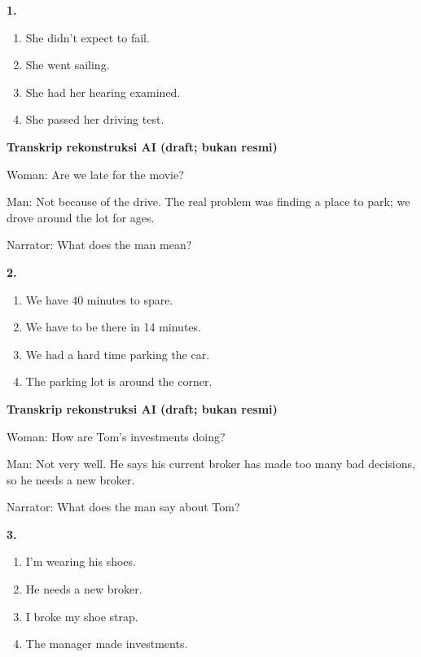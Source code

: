 \documentclass[12pt]{article}
\begin{document}
\noindent\textbf{1.}
\begin{enumerate}[label=(\Alph*),leftmargin=*,itemsep=0.2em]
\item She didn't expect to fail.
\item She went sailing.
\item She had her hearing examined.
\item She passed her driving test.
\end{enumerate}
\par
\vspace{0.25\baselineskip}
\begin{exampleblock}
\textbf{Transkrip rekonstruksi AI (draft; bukan resmi)}\par
Woman: Are we late for the movie?\par
Man: Not because of the drive. The real problem was finding a place to park; we drove around the lot for ages.\par
Narrator: What does the man mean?\par
\end{exampleblock}
\noindent\textbf{2.}
\begin{enumerate}[label=(\Alph*),leftmargin=*,itemsep=0.2em]
\item We have 40 minutes to spare.
\item We have to be there in 14 minutes.
\item We had a hard time parking the car.
\item The parking lot is around the corner.
\end{enumerate}
\par
\vspace{0.25\baselineskip}
\begin{exampleblock}
\textbf{Transkrip rekonstruksi AI (draft; bukan resmi)}\par
Woman: How are Tom's investments doing?\par
Man: Not very well. He says his current broker has made too many bad decisions, so he needs a new broker.\par
Narrator: What does the man say about Tom?\par
\end{exampleblock}
\noindent\textbf{3.}
\begin{enumerate}[label=(\Alph*),leftmargin=*,itemsep=0.2em]
\item I'm wearing his shoes.
\item He needs a new broker.
\item I broke my shoe strap.
\item The manager made investments.
\end{enumerate}
\end{document}
